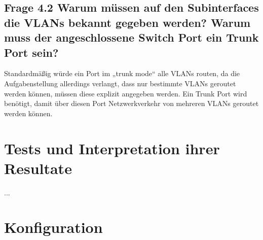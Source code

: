\documentclass{article}
\begin{document}
\subsection*{Frage 4.2 \normalfont Warum müssen auf den Subinterfaces die VLANs bekannt gegeben werden? Warum muss der angeschlossene Switch Port ein Trunk Port sein?}
Standardmäßig würde ein Port im „trunk mode“ alle VLANs routen, da die Aufgabenstellung allerdings verlangt, dass nur bestimmte VLANs geroutet werden können, müssen diese explizit angegeben werden. Ein Trunk Port wird benötigt, damit über diesen Port Netzwerkverkehr von mehreren VLANs geroutet werden können.

\section{Tests und Interpretation ihrer Resultate}

...

\section{Konfiguration}

% 
% 
\end{document}

